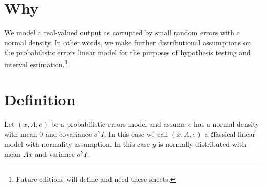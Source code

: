 

\section*{Why}

We model a real-valued output as corrupted by small random errors with a normal density.
In other words, we make further distributional assumptions on the probabilistic errors linear model for the purposes of hypothesis testing and interval estimation.\footnote{Future editions will define and need these sheets.}

\section*{Definition}

Let $(x, A, e)$ be a probabilistic errors model and assume $e$ has a normal density with mean $0$ and covariance $\sigma ^2I$.
In this case we call $(x, A, e)$ a \t{classical linear model with normality assumption}.
In this case $y$ is normally distributed with mean $Ax$ and variance $\sigma ^2I$.

\blankpage